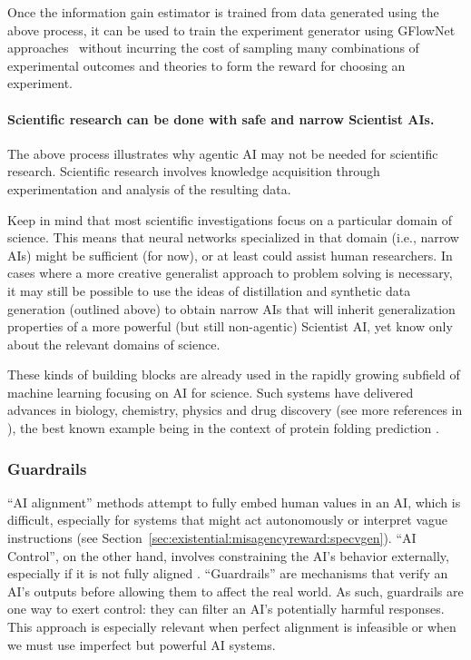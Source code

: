 Once the information gain estimator is trained from data generated using the above process, it can be used to train the experiment generator using GFlowNet approaches~\cite{proceedings.neurips.cc.paper.2021.hash.e614f646836aaed9f89ce58e837e2310.Abstract.html,pubs.rsc.org.en.content.articlehtml.2023.dd.d3dd00002h} without incurring the cost of sampling many combinations of experimental outcomes and theories to form the reward for choosing an experiment.

\paragraph{Scientific research can be done with safe and narrow Scientist AIs.} The above process illustrates why agentic AI may not be needed for scientific research. Scientific research involves knowledge acquisition through experimentation and analysis of the resulting data.

Keep in mind that most scientific investigations focus on a particular domain of science. This means that neural networks specialized in that domain (i.e., narrow AIs) might be sufficient (for now), or at least could assist human researchers. In cases where a more creative generalist approach to problem solving is necessary, it may still be possible to use the ideas of distillation \cite{arxiv.org.abs.1503.02531} and synthetic data generation (outlined above) to obtain narrow AIs that will inherit generalization properties of a more powerful (but still non-agentic) Scientist AI, yet know only about the relevant domains of science.

These kinds of building blocks are already used in the rapidly growing subfield of machine learning focusing on AI for science. Such systems have delivered advances in biology, chemistry, physics and drug discovery \cite{www.nature.com.articles.s41589.023.01349.8,www.nature.com.articles.s41586.023.06221.2,iopscience.iop.org.article.10.3847.1538.4357.ad9ded.meta} (see more references in \cite{pubs.rsc.org.en.content.articlehtml.2023.dd.d3dd00002h}), the best known example being in the context of protein folding prediction \cite{www.nature.com.articles.s41586.021.03819.2}. 

    \subsubsection{Guardrails}
    \label{sec:plan:application:guardrail} 
        
``AI alignment'' methods attempt to fully embed human values in an AI, which is difficult, especially for systems that might act autonomously or interpret vague instructions (see Section~\ref{sec:existential:misagencyreward:specvgen}). ``AI Control'', on the other hand, involves constraining the AI’s behavior externally, especially if it is not fully aligned \cite{greenblatt2023ai}. ``Guardrails'' are mechanisms that verify an AI’s outputs before allowing them to affect the real world. As such, guardrails are one way to exert control: they can filter an AI’s potentially harmful responses. This approach is especially relevant when perfect alignment is infeasible or when we must use imperfect but powerful AI systems.


